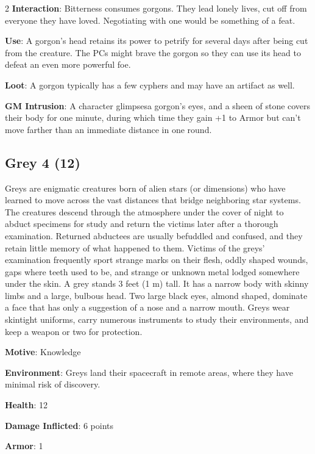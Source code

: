 \begin{multicols}{2}
\textbf{Interaction}: Bitterness consumes gorgons. They lead lonely lives, cut off from everyone they have loved. Negotiating with one would be something of a feat. 

\textbf{Use}: A gorgon’s head retains its power to petrify for several days after being cut from the creature. The PCs might brave the gorgon so they can use its head to defeat an even more powerful foe. 

\textbf{Loot}: A gorgon typically has a few cyphers and may have an artifact as well.

\textbf{GM Intrusion}: A character glimpsesa gorgon’s eyes, and a sheen of stone covers their body for one minute, during which time they gain +1 to Armor but can’t move farther than an immediate distance in one round.

\subsection{Grey 4 (12)}

Greys are enigmatic creatures born of alien stars (or dimensions) who have learned to move across the vast distances that bridge neighboring star systems. The creatures descend through the atmosphere under the cover of night to abduct specimens for study and return the victims later after a thorough examination. Returned abductees are usually befuddled and confused, and they retain little memory of what happened to them. Victims of the greys’ examination frequently sport strange marks on their flesh, oddly shaped wounds, gaps where teeth used to be, and strange or unknown metal lodged somewhere under the skin.
A grey stands 3 feet (1 m) tall. It has a narrow body with skinny limbs and a large, bulbous head. Two large black eyes, almond shaped, dominate a face that has only a suggestion of a nose and a narrow mouth. Greys wear skintight uniforms, carry numerous instruments to study their environments, and keep a weapon or two for protection.

\textbf{Motive}: Knowledge

\textbf{Environment}: Greys land their spacecraft in remote areas, where they have minimal risk of discovery. 

\textbf{Health}: 12

\textbf{Damage Inflicted}: 6 points

\textbf{Armor}: 1


\end{multicols}
